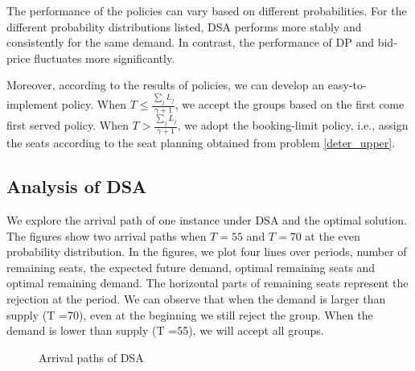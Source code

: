 
The performance of the policies can vary based on different probabilities. For the different probability distributions listed, DSA performs more stably and consistently for the same demand. In contrast, the performance of DP and bid-price fluctuates more significantly.

Moreover, according to the results of policies, we can develop an easy-to-implement policy. When $T \leq \frac{\sum_{j}{L_j}}{\gamma + 1}$, we accept the groups based on the first come first served policy.
When $T > \frac{\sum_{j}{L_j}}{\gamma + 1}$, we adopt the booking-limit policy, i.e., assign the seats according to the seat planning obtained from problem \eqref{deter_upper}.

\subsection*{Analysis of DSA}
We explore the arrival path of one instance under DSA and the optimal solution. The figures show two arrival paths when $T= 55$ and $T= 70$ at the even probability distribution. In the figures, we plot four lines over periods, number of remaining seats, the expected future demand, optimal remaining seats and optimal remaining demand. The horizontal parts of remaining seats represent the rejection at the period. We can observe that when the demand is larger than supply (T =70), even at the beginning we still reject the group. When the demand is lower than supply (T =55), we will accept all groups.

\newpage


\begin{figure}[h]
  \centering
  \caption{Arrival paths of DSA}
\end{figure}

